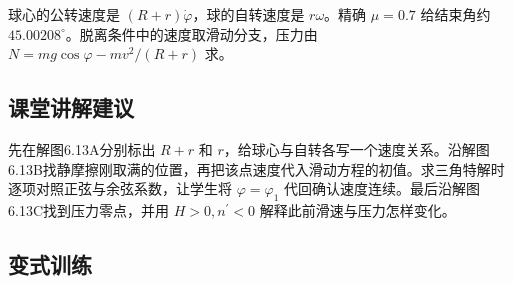 \documentclass[UTF8,fontset=fandol,a4paper,11pt]{ctexart}
\begin{document}
球心的公转速度是 $(R+r)\dot\varphi$，球的自转速度是 $r\omega$。精确 $\mu=0.7$ 给结束角约 $45.00208^\circ$。脱离条件中的速度取滑动分支，压力由 $N=mg\cos\varphi-mv^2/(R+r)$ 求。



\subsection*{课堂讲解建议}

先在解图6.13A分别标出 $R+r$ 和 $r$，给球心与自转各写一个速度关系。沿解图6.13B找静摩擦刚取满的位置，再把该点速度代入滑动方程的初值。求三角特解时逐项对照正弦与余弦系数，让学生将 $\varphi=\varphi_1$ 代回确认速度连续。最后沿解图6.13C找到压力零点，并用 $H>0,n^{\prime}<0$ 解释此前滑速与压力怎样变化。




\subsection*{变式训练}
\end{document}
